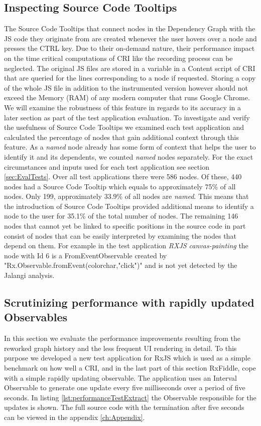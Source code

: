 	\subsection{Inspecting Source Code Tooltips}
	The Source Code Tooltips that connect nodes in the Dependency Graph with the JS code they originate from are created whenever the user hovers over a node and presses the CTRL key. Due to their on-demand nature, their performance impact on the time critical computations of CRI like the recording process can be neglected. The original JS files are stored in a variable in a Content script of CRI that are queried for the lines corresponding to a node if requested. Storing a copy of the whole JS file in addition to the instrumented version however should not exceed the Memory (RAM) of any modern computer that runs Google Chrome. We will examine the robustness of this feature in regards to its accuracy in a later section as part of the test application evaluation. To investigate and verify the usefulness of Source Code Tooltips we examined each test application and calculated the percentage of nodes that gain additional context through this feature. As a \emph{named} node already has some form of context that helps the user to identify it and its dependents, we counted \emph{named} nodes separately. For the exact circumstances and inputs used for each test application see section \ref{sec:EvalTests}. Over all test applications there were 586 nodes. Of these, 440 nodes had a Source Code Tooltip which equals to approximately 75\% of all nodes. Only 199, approximately 33.9\% of all nodes are \emph{named}. This means that the introduction of Source Code Tooltips provided additional means to identify a node to the user for 35.1\% of the total number of nodes. The remaining 146 nodes that cannot yet be linked to specific positions in the source code in part consist of nodes that can be easily interpreted by examining the nodes that depend on them. For example in the test application \emph{RXJS canvas-painting}
	the node with Id 6 is a FromEventObservable created by "Rx.Observable.fromEvent(colorchar,"click")" and is not yet detected by the Jalangi analysis.

	\subsection{Scrutinizing performance with rapidly updated Observables}
	\label{sec:PerformanceEvaluation}
	In this section we evaluate the performance improvements resulting from the reworked graph history and the less frequent UI rendering in detail. To this purpose we developed a new test application for RxJS which is used as a simple benchmark on how well a CRI, and in the last part of this section RxFiddle, cope with a simple rapidly updating observable. The application uses an Interval Observable to generate one update every five milliseconds over a period of five seconds. In listing \ref{lst:performanceTestExtract} the Observable responsible for the updates is shown. The full source code with the termination after five seconds can be viewed in the appendix \ref{ch:Appendix}. %
	
